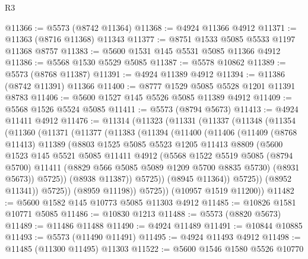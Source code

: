 \begin{lexlean}{R3}
\begin{coremodule}
@11366 := @5573 (@8742 @11364)
@11368 := @4924 @11366 @4912
@11371 := @11363 (@8716 @11368) @11343
@11377 := @8751 @1533 @5085 @5533 @1197 @11368 @8757
@11383 := @5600 @1531 @145 @5531 @5085 @11366 @4912
@11386 := @5568 @1530 @5529 @5085
@11387 := @5578 @10862
@11389 := @5573 (@8768 @11387)
@11391 := @4924 @11389 @4912
@11394 := @11386 (@8742 @11391) @11366
@11400 := @8777 @1529 @5085 @5528 @1201 @11391 @8783
@11406 := @5600 @1527 @145 @5526 @5085 @11389 @4912
@11409 := @5568 @1526 @5524 @5085
@11411 := @5573 (@8794 @5673)
@11413 := @4924 @11411 @4912
@11476 := @11314
    (@11323
      (@11331
        (@11337
          (@11348
            (@11354
              (@11360
                (@11371
                  (@11377
                    (@11383
                      (@11394
                        (@11400
                          (@11406
                            (@11409
                              (@8768 @11413)
                              @11389
                              (@8803
                                @1525
                                @5085
                                @5523
                                @1205
                                @11413
                                @8809
                                (@5600
                                  @1523
                                  @145
                                  @5521
                                  @5085
                                  @11411
                                  @4912
                                  (@5568
                                    @1522
                                    @5519
                                    @5085
                                    (@8794 @5700)
                                    @11411
                                    (@8829 @566 @5085 @5089 @1209 @5700 @8835 @5730)
                                    (@8931 @5673))
                                  @5725))
                              (@8938 @11387))
                            @5725))
                        (@8945 @11364))
                      @5725))
                  (@8952 @11341))
                @5725))
            (@8959 @11198))
          @5725))
      (@10957 @1519 @11200))
@11482 := @5600 @1582 @145 @10773 @5085 @11303 @4912
@11485 := @10826 @1581 @10771 @5085
@11486 := @10830 @1213
@11488 := @5573 (@8820 @5673)
@11489 := @11486 @11488
@11490 := @4924 @11489
@11491 := @10844 @10885
@11493 := @5573 (@11490 @11491)
@11495 := @4924 @11493 @4912
@11498 := @11485 (@11300 @11495) @11303
@11522 := @5600
    @1546
    @1580
    @5526
    @10770

\end{coremodule}
\end{lexlean}
